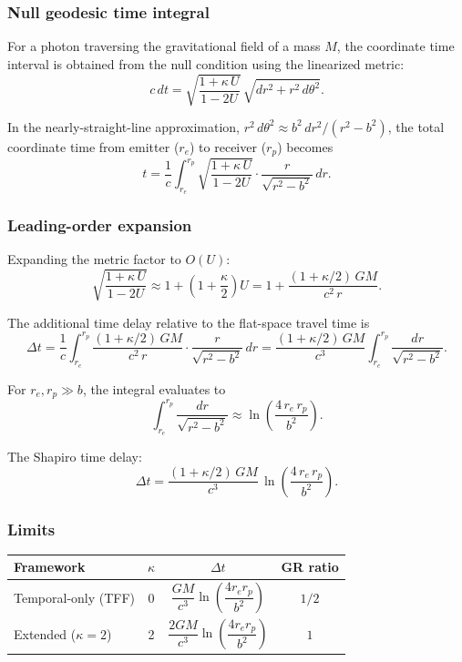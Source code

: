 \documentclass[12pt]{article}
\begin{document}
\subsubsection{Null geodesic time integral}

For a photon traversing the gravitational field of a mass $M$, the coordinate time interval is obtained from the null condition using the linearized metric:
$$
c\,dt = \sqrt{\frac{1 + \kappa\,U}{1 - 2U}}\,\sqrt{dr^2 + r^2\,d\theta^2}.
$$

In the nearly-straight-line approximation, $r^2\,d\theta^2 \approx b^2\,dr^2/(r^2 - b^2)$, the total coordinate time from emitter ($r_e$) to receiver ($r_p$) becomes
$$
t = \frac{1}{c}\int_{r_e}^{r_p}\sqrt{\frac{1 + \kappa\,U}{1 - 2U}} \cdot \frac{r}{\sqrt{r^2 - b^2}}\,dr.
$$

\subsubsection{Leading-order expansion}

Expanding the metric factor to $O(U)$:
$$
\sqrt{\frac{1 + \kappa\,U}{1 - 2U}} \approx 1 + \left(1 + \frac{\kappa}{2}\right)U = 1 + \frac{(1 + \kappa/2)\,GM}{c^2\,r}.
$$

The additional time delay relative to the flat-space travel time is
$$
\Delta t = \frac{1}{c}\int_{r_e}^{r_p}\frac{(1 + \kappa/2)\,GM}{c^2\,r} \cdot \frac{r}{\sqrt{r^2 - b^2}}\,dr = \frac{(1 + \kappa/2)\,GM}{c^3}\int_{r_e}^{r_p}\frac{dr}{\sqrt{r^2 - b^2}}.
$$

For $r_e, r_p \gg b$, the integral evaluates to
$$
\int_{r_e}^{r_p}\frac{dr}{\sqrt{r^2 - b^2}} \approx \ln\!\left(\frac{4\,r_e\,r_p}{b^2}\right).
$$

The Shapiro time delay:
\begin{equation}
\boxed{\Delta t = \frac{(1 + \kappa/2)\,GM}{c^3}\,\ln\!\left(\frac{4\,r_e\,r_p}{b^2}\right).}
\label{eq:shapiro}
\end{equation}

\subsubsection{Limits}

\begin{center}
\small
\begin{tabular}{lccc}
\hline
Framework & $\kappa$ & $\Delta t$ & GR ratio \\
\hline
Temporal-only (TFF) & 0 & $\dfrac{GM}{c^3}\ln\!\left(\dfrac{4r_e r_p}{b^2}\right)$ & $1/2$ \\[8pt]
Extended ($\kappa = 2$) & 2 & $\dfrac{2GM}{c^3}\ln\!\left(\dfrac{4r_e r_p}{b^2}\right)$ & $1$ \\
\hline
\end{tabular}
\end{center}
\end{document}
